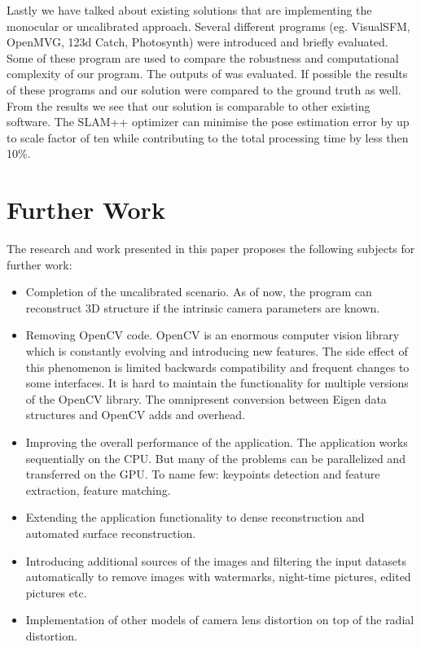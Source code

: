 Lastly we have talked about existing solutions that are implementing the monocular or uncalibrated approach. Several different programs (eg. VisualSFM, OpenMVG, 123d Catch, Photosynth) were introduced and briefly evaluated. Some of these program are used to compare the robustness and computational complexity of our program. The outputs of  was evaluated. If possible the results of these programs and our solution were compared to the ground truth as well. From the results we see that our solution is comparable to other existing software. The SLAM++ optimizer can minimise the pose estimation error by up to scale factor of ten while contributing to the total processing time by less then 10\%. 

\section{Further Work}
The research and work presented in this paper proposes the following subjects for further work:
\begin{itemize}
	\item Completion of the uncalibrated scenario. As of now, the program can reconstruct 3D structure if the intrinsic camera parameters are known.
	
	\item Removing OpenCV code. OpenCV is an enormous computer vision library which is constantly evolving and introducing new features. The side effect of this phenomenon is limited backwards compatibility and frequent changes to some interfaces. It is hard to maintain the functionality for multiple versions of the OpenCV library. The omnipresent conversion between Eigen data structures and OpenCV  adds and overhead.
	
	\item Improving the overall performance of the application. The application works sequentially on the CPU. But many of the problems can be parallelized and transferred on the GPU. To name few: keypoints detection and feature extraction, feature matching.
	
	\item Extending the application functionality to dense reconstruction and automated surface reconstruction.
	
	\item Introducing additional sources of the images and filtering the input datasets automatically to remove images with watermarks, night-time pictures, edited pictures etc.
	
	\item Implementation of other models of camera lens distortion on top of the radial distortion.
\end{itemize}
